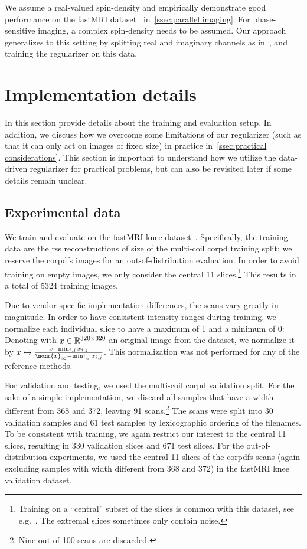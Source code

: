 We assume a real-valued spin-density and empirically demonstrate good performance on the fastMRI dataset~\cite{zbontar_fastmri_2018} in~\cref{ssec:parallel imaging}.
For phase-sensitive imaging, a complex spin-density needs to be assumed.
Our approach generalizes to this setting by splitting real and imaginary channels as in~\cite{Narnhofer2019,sriram_endtoend_2020}, and training the regularizer on this data.
\section{Implementation details}%
\label{ssec:details}
In this section provide details about the training and evaluation setup.
In addition, we discuss how we overcome some limitations of our regularizer (such as that it can only act on images of fixed size) in practice in~\cref{ssec:practical considerations}.
This section is important to understand how we utilize the data-driven regularizer for practical problems, but can also be revisited later if some details remain unclear.
\subsection{Experimental data}%
\label{ssec:experimental data}
We train and evaluate on the fastMRI knee dataset~\cite{Knoll2020}.
Specifically, the training data are the \gls{rss} reconstructions of size  of the multi-coil \gls{corpd} training split; we reserve the \gls{corpdfs} images for an out-of-distribution evaluation.
In order to avoid training on empty images, we only consider the central \num{11} slices.\footnote{%
	Training on a \enquote{central} subset of the slices is common with this dataset, see e.g.~\cite[section 4.1]{chung_scoremri_2022}.
	The extremal slices sometimes only contain noise.
}
This results in a total of \num{5324} training images.

Due to vendor-specific implementation differences, the scans vary greatly in magnitude.
In order to have consistent intensity ranges during training, we normalize each individual slice to have a maximum of 1 and a minimum of 0:
Denoting with \( x \in \R^{\numproduct{320x320}} \) an original image from the dataset, we normalize it by \( x \mapsto \frac{x - \min_{i, j} x_{i, j}}{\norm{x}_\infty - \min_{i, j} x_{i, j}} \).
This normalization was not performed for any of the reference methods.

For validation and testing, we used the multi-coil \gls{corpd} validation split.
For the sake of a simple implementation, we discard all samples that have a width different from \num{368} and \num{372}, leaving \num{91} scans.\footnote{Nine out of 100 scans are discarded.}
The scans were split into \num{30} validation samples and \num{61} test samples by lexicographic ordering of the filenames.
To be consistent with training, we again restrict our interest to the central \num{11} slices, resulting in \num{330} validation slices and \num{671} test slices.
For the out-of-distribution experiments, we used the central \num{11} slices of the \gls{corpdfs} scans (again excluding samples with width different from \num{368} and \num{372}) in the fastMRI knee validation dataset.

